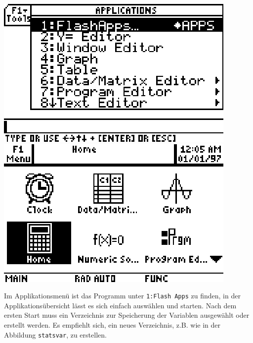 \documentclass[a4paper,11pt,notitlepage,halfparskip,headsepline,normalheadings,twoside]{scrartcl}
\begin{document}
\begin{center}
\includegraphics{eps/menuold}
\includegraphics{eps/menunew}
\end{center}

\begin{window}
Im Applikationsmenü ist das Programm unter \texttt{1:Flash Apps} zu finden, in
der Applikationsübersicht lässt es sich einfach auswählen und starten. Nach dem
ersten Start muss ein Verzeichnis zur Speicherung der Variablen ausgewählt
oder erstellt werden. Es empfiehlt sich, ein neues Verzeichnis, z.B. wie in der
Abbildung \texttt{statsvar}, zu erstellen.
\end{window}
\end{document}
